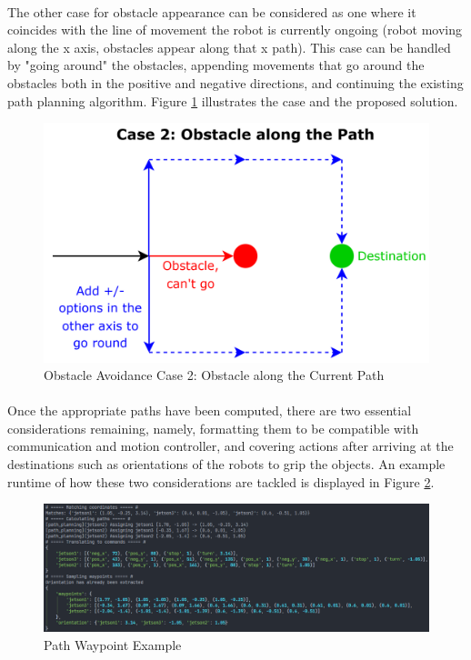\paragraph*{}
The other case for obstacle appearance can be considered as one where it coincides with the line of movement the robot is currently ongoing (robot moving along the x axis, obstacles appear along that x path). This case can be handled by "going around" the obstacles, appending movements that go around the obstacles both in the positive and negative directions, and continuing the existing path planning algorithm. Figure \ref{fig:obstacle-avoidance-case-2} illustrates the case and the proposed solution.

\begin{figure} [H]
    \centering
    \includegraphics[width=0.75\linewidth]{assets/images/formation/obstacle-avoidance-case2.png}
    \caption{Obstacle Avoidance Case 2: Obstacle along the Current Path}
    \label{fig:obstacle-avoidance-case-2}
\end{figure}

\paragraph*{}
Once the appropriate paths have been computed, there are two essential considerations remaining, namely, formatting them to be compatible with communication and motion controller, and covering actions after arriving at the destinations such as orientations of the robots to grip the objects. An example runtime of how these two considerations are tackled is displayed in Figure \ref{fig:path-waypoint}.

\begin{figure} [H]
    \centering
    \includegraphics[width=1\linewidth]{assets/images/formation/path-waypoint.png}
    \caption{Path Waypoint Example}
    \label{fig:path-waypoint}
\end{figure}

